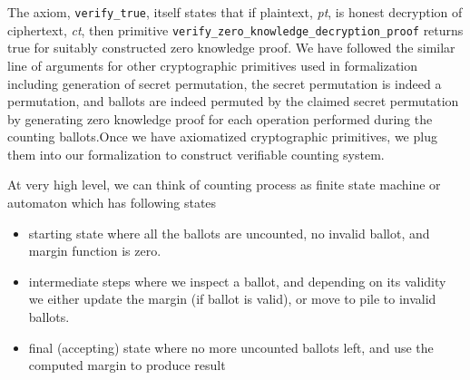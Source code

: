 \documentclass{llncs}
\begin{document}
 The axiom, \texttt{verify\_true}, itself states that if plaintext, \textit{pt}, is honest
 decryption of ciphertext, \textit{ct}, then primitive
 \texttt{verify\_zero\_knowledge\_decryption\_proof} returns true for 
 suitably constructed zero knowledge proof. We have followed the similar line of 
 arguments for other cryptographic primitives used in formalization including generation
  of secret permutation, 
 the secret permutation is indeed a permutation, and ballots are indeed permuted by the
 claimed secret permutation by generating zero knowledge proof 
 for each operation performed during the counting ballots.Once we have axiomatized
  cryptographic primitives, we plug them into our 
 formalization to construct verifiable counting system. 
 
 At very high level, we can think of counting process as finite state machine or 
 automaton which has following states 
 \begin{itemize}
 \item starting state where all the ballots are uncounted, 
       no invalid ballot, and margin function is zero.
 \item intermediate steps where we inspect a ballot, and depending on its validity
       we either update the margin (if ballot is valid), or move to pile to 
       invalid ballots.
  \item final (accepting) state where no more uncounted ballots left, and use 
  		the computed margin to produce result  
 \end{itemize}
 
\end{document}
